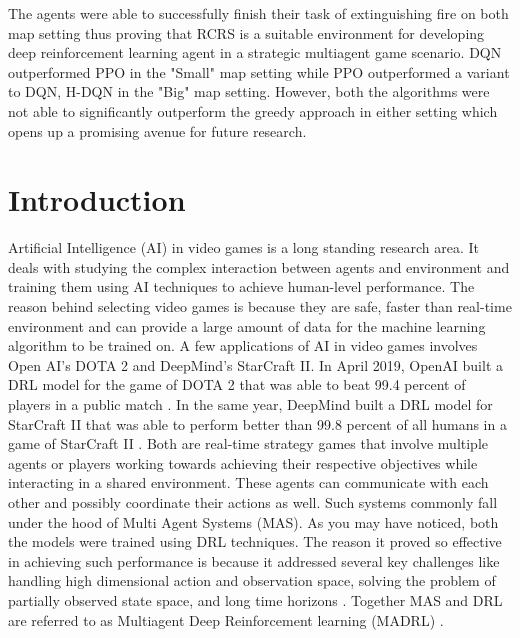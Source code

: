 \documentclass[12pt]{report}
\begin{document}
\begin{thesisabstract}
The agents were able to successfully finish their task of extinguishing fire on both map setting thus proving that RCRS is a suitable environment for developing deep reinforcement learning agent in a strategic multiagent game scenario. DQN outperformed PPO in the "Small" map setting while PPO outperformed a variant to DQN, H-DQN in the "Big" map setting. However, both the algorithms were not able to significantly outperform the greedy approach in either setting which opens up a promising avenue for future research. 
                                
\end{thesisabstract}                 

\tableofcontents                     

\newpage

%
\listoffigures
\newpage
{}%
\listofalgorithms
\newpage
{}%
\listoftables
\newpage

\chapter{Introduction}            

Artificial Intelligence (AI) in video games is a long standing research area. It deals with studying the complex interaction between agents and environment and training them using AI techniques to achieve human-level performance. The reason behind selecting video games is because they are safe, faster than real-time environment and can provide a large amount of data for the machine learning algorithm to be trained on. A few applications of AI in video games involves Open AI's DOTA 2 and DeepMind's StarCraft II. In April 2019, OpenAI built a DRL model for the game of DOTA 2 that was able to beat 99.4 percent of players in a public match \cite{dota2}. In the same year, DeepMind built a DRL model for StarCraft II that was able to perform better than 99.8 percent of all humans in a game of StarCraft II \cite{Starcraft2}. Both are real-time strategy games that involve multiple agents or players working towards achieving their respective objectives while interacting in a shared environment. These agents can communicate with each other and possibly coordinate their actions as well. Such systems commonly fall under the hood of Multi Agent Systems (MAS). As you may have noticed, both the models were trained using DRL techniques. The reason it proved so effective in achieving such performance is because it addressed several key challenges like handling high dimensional action and observation space, solving the problem of partially observed state space, and long time horizons \cite{dota2}. Together MAS and DRL are referred to as Multiagent Deep Reinforcement learning (MADRL) \cite{Shao}. 
\end{document}
